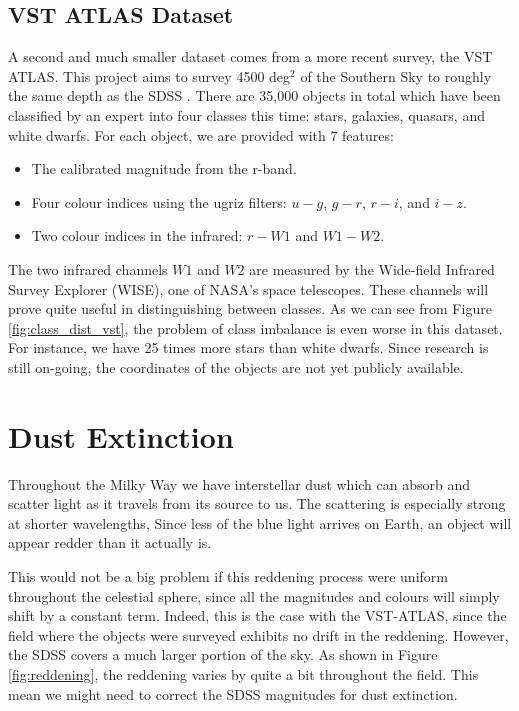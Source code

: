 \subsection{VST ATLAS Dataset}
A second and much smaller dataset comes from a more recent survey, the VST ATLAS. This project
aims to survey 4500 deg$^2$ of the Southern Sky to roughly the same depth as the SDSS
\cite{shanks15}.
There are 35,000 objects in total which have been classified by an expert into four classes
this time: stars, galaxies, quasars, and white dwarfs. For each object, we are provided
with 7 features:
	\begin{itemize}
		\item The calibrated magnitude from the r-band.
		\item Four colour indices using the ugriz filters: $u-g$, $g-r$, $r-i$, and $i-z$.
		\item Two colour indices in the infrared: $r-W1$ and $W1-W2$.
	\end{itemize}
The two infrared channels $W1$ and $W2$ are measured by the Wide-field Infrared Survey Explorer
(WISE), one of NASA's space telescopes. These channels will prove quite useful in distinguishing
between classes. As we can see from Figure \ref{fig:class_dist_vst}, the problem of class
imbalance is even worse in this dataset. For instance, we have 25 times more stars than white
dwarfs. Since research is still on-going, the coordinates of the objects are not yet publicly
available.



\section{Dust Extinction}
Throughout the Milky Way we have interstellar dust which can absorb and scatter light as it
travels from its source to us. The scattering is especially strong at shorter wavelengths,
Since less of the blue light arrives on Earth, an object will appear redder than it actually
is.

This would not be a big problem if this reddening process were uniform throughout the
celestial sphere, since all the magnitudes and colours will simply shift by a constant
term. Indeed, this is the case with the VST-ATLAS, since the field where the objects were
surveyed exhibits no drift in the reddening.
However, the SDSS covers a much larger portion of the sky. As shown in
Figure \ref{fig:reddening}, the reddening varies by quite a bit throughout the field. This
mean we might need to correct the SDSS magnitudes for dust extinction.

